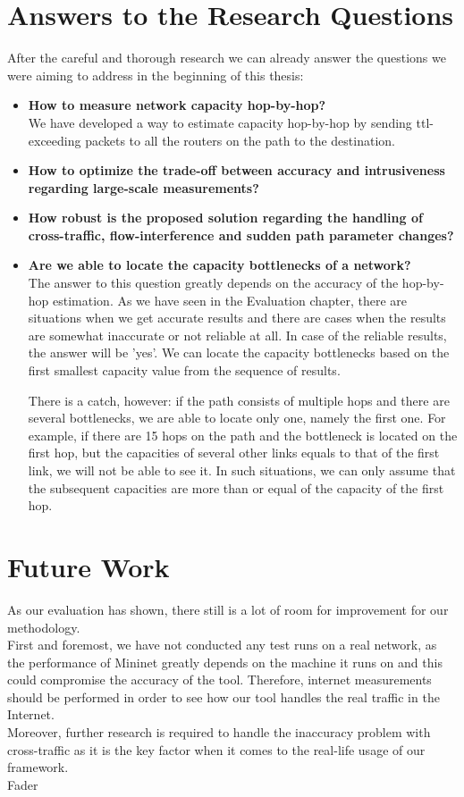 \section{Answers to the Research Questions}
After the careful and thorough research we can already answer the questions we were aiming to address in the beginning of this thesis: \\
\begin{itemize}
  \item \textbf{How to measure network capacity hop-by-hop?}
  \\ We have developed a way to estimate capacity hop-by-hop by sending ttl-exceeding packets to all the routers on the path to the destination. 
  \item \textbf{How to optimize the trade-off between accuracy and intrusiveness regarding large-scale measurements?}
  \\
  \item \textbf{How robust is the proposed solution regarding the handling of cross-traffic, flow-interference and sudden path parameter changes?}
  \\
  \item \textbf{Are we able to locate the capacity bottlenecks of a network?}
  \\ The answer to this question greatly depends on the accuracy of the hop-by-hop estimation. As we have seen in the Evaluation chapter, there are situations when we get accurate results and there are cases when the results are somewhat inaccurate or not reliable at all. In case of the reliable results, the answer will be 'yes'. We can locate the capacity bottlenecks based on the first smallest capacity value from the sequence of results. 
  
  There is a catch, however: if the path consists of multiple hops and there are several bottlenecks, we are able to locate only one, namely the first one. For example, if there are 15 hops on the path and the bottleneck is located on the first hop, but the capacities of several other links equals to that of the first link, we will not be able to see it. In such situations, we can only assume that the subsequent capacities are more than or equal of the capacity of the first hop.
\end{itemize}

\section{Future Work}
As our evaluation has shown, there still is a lot of room for improvement for our methodology.\\
First and foremost, we have not conducted any test runs on a real network, as the performance of Mininet greatly depends on the machine it runs on and this could compromise the accuracy of the tool. Therefore, internet measurements should be performed in order to see how our tool handles the real traffic in the Internet.\\
Moreover, further research is required to handle the inaccuracy problem with cross-traffic as it is the key factor when it comes to the real-life usage of our framework.\\
Fader\cite{fader2017}
